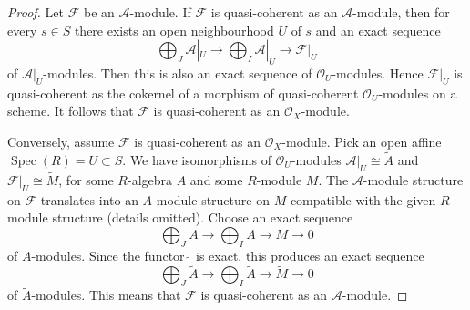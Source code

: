 \documentclass[10pt,a4paper]{amsart}
\theoremstyle{plain}
\theoremstyle{definition}
\theoremstyle{remark}
\numberwithin{equation}{subsection}
\def\Spec{\mathop{\mathrm{Spec}}}
\begin{document}
\begin{proof}
Let $\mathcal{F}$ be an $\mathcal{A}$-module.
If $\mathcal{F}$ is quasi-coherent as an $\mathcal{A}$-module, then
for every $s \in S$ there exists an open neighbourhood $U$ of $s$
and an exact sequence
$$
\bigoplus\nolimits_J\mathcal{A}|_U\to
\bigoplus\nolimits_I\mathcal{A}|_U\to
\mathcal{F}|_U
$$
of $\mathcal{A}|_U$-modules.
Then this is also an exact sequence of $\mathcal{O}_U$-modules.
Hence $\mathcal{F}|_U$ is quasi-coherent as the cokernel of a morphism
of quasi-coherent $\mathcal{O}_U$-modules on a scheme. It follows
that $\mathcal{F}$ is quasi-coherent as an $\mathcal{O}_X$-module.

\medskip\noindent
Conversely, assume $\mathcal{F}$ is quasi-coherent as an $\mathcal{O}_X$-module.
Pick an open affine $\Spec(R) = U \subset S$. We have isomorphisms of
$\mathcal{O}_U$-modules $\mathcal{A}|_U \cong \widetilde{A}$ and
$\mathcal{F}|_U \cong \widetilde{M}$, for some $R$-algebra $A$
and some $R$-module $M$. The $\mathcal{A}$-module structure on $\mathcal{F}$
translates into an $A$-module structure on $M$ compatible with the
given $R$-module structure (details omitted). Choose an exact sequence
$$
\bigoplus\nolimits_J A \to
\bigoplus\nolimits_I A \to
M \to 0
$$
of $A$-modules. Since the functor $\widetilde{\ }$ is exact, this
produces an exact sequence
$$
\bigoplus\nolimits_J \widetilde{A}\to
\bigoplus\nolimits_I \widetilde{A}\to
\widetilde{M} \to 0
$$
of $\widetilde{A}$-modules. This means that
$\mathcal{F}$ is quasi-coherent as an $\mathcal{A}$-module.
\end{proof}
\end{document}
